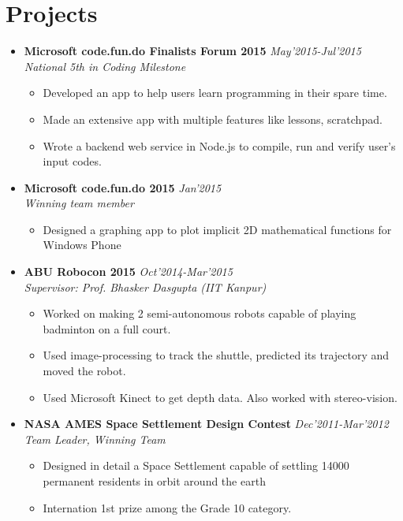 \documentclass[11pt,a4paper]{article}
\begin{document}
\section*{Projects}
\begin {itemize}

\item \textbf{\large{Microsoft code.fun.do Finalists Forum 2015}} \hfill\textit{ May'2015-Jul'2015}\\ \emph{National 5th in Coding Milestone}
    \begin{itemize}
    \setlength \itemsep{0em}
    \item Developed an app to help users learn programming in their spare time.
    \item Made an extensive app with multiple features like lessons, scratchpad.
    \item Wrote a backend web service in Node.js to compile, run and verify user's input codes.
\\
    \end{itemize}

\item \textbf{\large{Microsoft code.fun.do 2015}} \hfill\textit{ Jan'2015}\\ \emph{Winning team member}
    \begin{itemize}
    \setlength \itemsep{0em}
    \item Designed a graphing app to plot implicit 2D mathematical functions for Windows Phone
\\
    \end{itemize}

\item \textbf{\large{ABU Robocon 2015}} \hfill\textit{ Oct'2014-Mar'2015}\\ \emph{Supervisor: Prof. Bhasker Dasgupta (IIT Kanpur)}
    \begin{itemize}
    \setlength \itemsep{0em}
    \item Worked on making 2 semi-autonomous robots capable of playing badminton on a full court.
    \item Used image-processing to track the shuttle, predicted its trajectory and moved the robot.
    \item Used Microsoft Kinect to get depth data. Also worked with stereo-vision.
\\
    \end{itemize}

\item \textbf{\large{NASA AMES Space Settlement Design Contest}} \hfill\textit{ Dec'2011-Mar'2012}\\ \emph{Team Leader, Winning Team}
    \begin{itemize}
    \setlength \itemsep{0em}
    \item Designed in detail a Space Settlement capable of settling 14000 permanent residents in orbit around the earth
    \item Internation 1st prize among the Grade 10 category.
\\
    \end{itemize}


\end{itemize}
\end{document}
